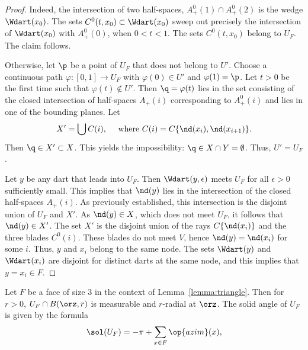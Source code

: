 \begin{proof} 
Indeed, the intersection of two half-spaces, $A^0_+(1)\cap
  A^0_+(2)$ is the wedge $\Wdart(x_0)$.  The sets
  $C^0(t,x_0)\subset\Wdart(x_0)$ sweep out precisely the intersection
  of $\Wdart(x_0)$ with $A^0_+(0)$, when $0<t<1$.  The sets
  $C^0(t,x_0)$ belong to $U_F$.  The claim follows.

 Otherwise,
let $\p$ be a point of $U_F$ that does
not belong to $U'$.  Choose a continuous path $\varphi:[0,1]\to U_F$
with $\varphi(0)\in U'$ and $\varphi(1)=\p$.  Let $t>0$ be the first
time such that $\varphi(t)\not\in U'$.  Then $\q=\varphi(t)$ lies in
the set consisting of the closed intersection of half-spaces
$A_+(i)$ corresponding to $A^0_+(i)$ and lies in one of the bounding
planes.  Let
\begin{displaymath}
X' = \bigcup C(i),\quad\text{ where } C(i)=C\{\nd(x_i),\nd(x_{i+1})\}.
\end{displaymath}
Then $\q\in X'\subset X$.  This yields the impossibility:
$\q\in X\cap Y = \emptyset$.   Thus, $U'=U_F$.

Let $y$ be any dart that leads into $U_F$.  Then
$\Wdart(y,\epsilon)$ meets $U_F$ for all $\epsilon>0$ sufficiently
small.  This implies that $\nd(y)$ lies in the intersection of the
closed half-spaces $A_+(i)$.  As previously established, this
intersection is the disjoint union of $U_F$ and $X'$.  As $\nd(y)\in
X$, which does not meet $U_F$, it follows that $\nd(y)\in X'$.  The set
$X'$ is the disjoint union of the rays $C\{\nd(x_i)\}$ and the three
blades $C^0(i)$.  These blades do not meet $V$, hence $\nd(y)=\nd(x_i)$
for some $i$.  Thus, $y$ and $x_i$ belong to the same node.  The sets
$\Wdart(y)$ and $\Wdart( x_i)$ are disjoint for distinct darts at the
same node, and this implies that $y=x_i\in F$.
\end{proof}

\begin{corollary}\label{lemma:girard-component}
Let $F$ be a face of size $3$ in the context of
Lemma~\ref{lemma:triangle}.  Then for $r>0$, $U_F \cap B(\orz,r)$ is
measurable and $r$-radial at $\orz$.  The solid angle of $U_F$ is
given by the formula
\begin{displaymath}
\sol(U_F) = -\pi + \sum_{x\in F}\op{azim}(x),
\end{displaymath}
\end{corollary}
%
%
%

